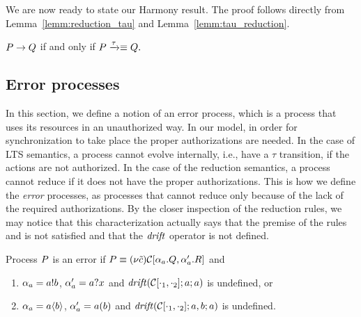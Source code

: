 We are now ready to state our Harmony result. The proof follows directly from Lemma~\ref{lemm:reduction_tau} and Lemma~\ref{lemm:tau_reduction}.


\begin{corollary}[Harmony]\label{cor:red=tau} 
$P\rightarrow Q$ if and only if $P \xrightarrow{\tau}\equiv Q.$ 
\end{corollary}










\subsection{Error processes}\label{sec:auth_errors}
In this section, we define a notion of an error process, which is a process that uses its resources in an  unauthorized way. 
In our model, in order for synchronization to take place the proper authorizations are needed. In the case of LTS semantics, a process cannot evolve internally, i.e., have a $\tau$ transition, if the actions are not authorized. In the case of the reduction semantics, a process cannot reduce if it does not have the proper authorizations. This is how we define the \emph{error} processes, as processes that cannot reduce only because of the lack of the required authorizations. 
By the closer inspection of the reduction rules, we may notice that this characterization actually says that the premise of the rules  and  is not satisfied and that the $\mathit {drift}$ operator is not defined. 


\begin{definition}[Error]\label{d:error}
Process $P$ is an error if $P\equiv (\nu \tilde{c}) \mathcal{C}[\alpha_a.Q, \alpha_a'.R]$ and 
\begin{enumerate}
\item 
$\alpha_a = a!b$, 
$\alpha_a' = a?x$
and
$ \mathit {drift}(\mathcal{C}[\cdot_1,\cdot_2];a;a)$  is undefined, or 
\item 
$\alpha_a = a\langle b\rangle$, 
$\alpha_a' = a(b)$
and
$ \mathit {drift}(\mathcal{C}[\cdot_1,\cdot_2];a,b;a)$ is undefined.
\end{enumerate}
\end{definition}

